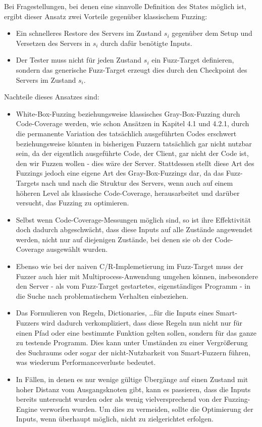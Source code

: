 \documentclass[a4paper]{article}
\begin{document}
Bei Fragestellungen, bei denen eine sinnvolle Definition des States möglich ist, ergibt dieser Ansatz zwei Vorteile gegenüber klassischem Fuzzing:
\begin{itemize}
    \item Ein schnelleres Restore des Servers im Zustand $s_i$ gegenüber dem Setup und Versetzen des Servers in $s_i$ durch dafür benötigte Inputs.
    \item Der Tester muss nicht für jeden Zustand $s_i$ ein Fuzz-Target definieren, sondern das generische Fuzz-Target erzeugt dies durch den Checkpoint des Servers im Zustand $s_i$.
\end{itemize}
Nachteile dieses Ansatzes sind:
\begin{itemize}
    \item White-Box-Fuzzing beziehungsweise klassisches Gray-Box-Fuzzing durch Code-Coverage werden, wie schon Ansätzen in Kapitel 4.1 und 4.2.1, durch die permanente Variation des tatsächlich ausgeführten Codes erschwert beziehungsweise könnten in bisherigen Fuzzern tatsächlich gar nicht nutzbar sein, da der eigentlich ausgeführte Code, der Client, gar nicht der Code ist, den wir Fuzzen wollen - dies wäre der Server. 
        Stattdessen stellt diese Art des Fuzzings jedoch eine eigene Art des Gray-Box-Fuzzings dar, da das Fuzz-Targets nach und nach die Struktur des Servers, wenn auch auf einem höheren Level als klassische Code-Coverage, herausarbeitet und darüber versucht, das Fuzzing zu optimieren.
    \item Selbst wenn Code-Coverage-Messungen möglich sind, so ist ihre Effektivität doch dadurch abgeschwächt, dass diese Inputs auf alle Zustände angewendet werden, nicht nur auf diejenigen Zustände, bei denen sie ob der Code-Coverage ausgewählt wurden. 
    \item Ebenso wie bei der naiven C/R-Implemetierung im Fuzz-Target muss der Fuzzer auch hier mit Multiprocess-Anwendung umgehen können, insbesondere den Server - als vom Fuzz-Target gestartetes, eigenständiges Programm - in die Suche nach problematischem Verhalten einbeziehen.
    \item Das Formulieren von Regeln, Dictionaries, \dots für die Inputs eines Smart-Fuzzers wird dadurch verkompliziert, dass diese Regeln nun nicht nur für einen Pfad oder eine bestimmte Funktion gelten sollen, sondern für das ganze zu testende Programm. 
        Dies kann unter Umständen zu einer Vergrößerung des Suchraums oder sogar der nicht-Nutzbarkeit von Smart-Fuzzern führen, was wiederum Performanceverluste bedeutet.
    \item In Fällen, in denen es nur wenige gültige Übergänge auf einen Zustand mit hoher Distanz vom Ausgangsknoten gibt, kann es passieren, dass die Inputs bereits untersucht wurden oder als wenig vielversprechend von der Fuzzing-Engine verworfen wurden. Um dies zu vermeiden, sollte die Optimierung der Inputs, wenn überhaupt möglich, nicht zu zielgerichtet erfolgen.
    
\end{itemize}
\end{document}
